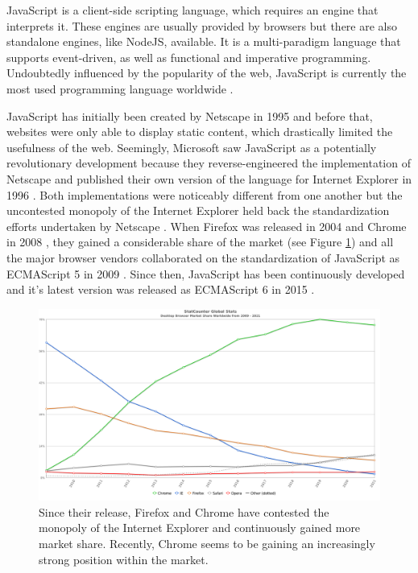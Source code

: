 JavaScript is a client-side scripting language, which requires an engine that interprets it. These engines are usually provided by browsers but there are also standalone engines, like NodeJS, available. It is a multi-paradigm language that supports event-driven, as well as functional and imperative programming. Undoubtedly influenced by the popularity of the web, JavaScript is currently the most used programming language worldwide \parencite{StatisticProgrammingLanguageUsage}.

JavaScript has initially been created by Netscape in 1995 \parencite{JSFirstRelease} and before that, websites were only able to display static content, which drastically limited the usefulness of the web. Seemingly, Microsoft saw JavaScript as a potentially revolutionary development because they reverse-engineered the implementation of Netscape and published their own version of the language for Internet Explorer in 1996 \parencite{JSIERelease}. Both implementations were noticeably different from one another but the uncontested monopoly of the Internet Explorer \parencite{BrowserMarketShareEarly} held back the standardization efforts undertaken by Netscape \parencite{ECMAScript1}. When Firefox was released in 2004 \parencite{FirefoxFirstRelease} and Chrome in 2008 \parencite{ChromeFirstRelease}, they gained a considerable share of the market \parencite{BrowserMarketShare} (see Figure \ref{fig:BrowserMarketShare}) and all the major browser vendors collaborated on the standardization of JavaScript as ECMAScript 5 in 2009 \parencite{ECMAScript5}. Since then, JavaScript has been continuously developed and it's latest version was released as ECMAScript 6 in 2015 \parencite{ECMAScript6}.


\begin{figure}[tp]
    \centering
    \includegraphics[keepaspectratio,width=\linewidth,height=\fullh / 2]
    {images/browser-market-share.png}

    \caption[Desktop Browser Market Share]{
        Since their release, Firefox and Chrome have contested the monopoly of the Internet Explorer and continuously gained more market share. Recently, Chrome seems to be gaining an increasingly strong position within the market.
    }
    \label{fig:BrowserMarketShare}
\end{figure}

